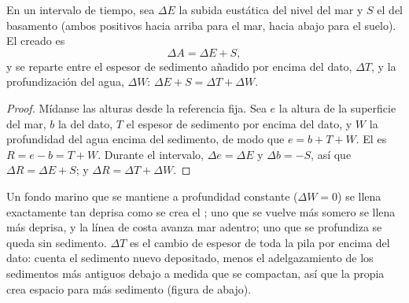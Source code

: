 \begin{proposition}\label{prop:b1:diagenesis-basins:budget}
En un intervalo de tiempo, sea $\Delta E$ la subida eustática del nivel del mar y $S$ el  del basamento (ambos positivos hacia arriba para el mar, hacia abajo para el suelo). El  creado es
\[
  \Delta A = \Delta E + S ,
\]
y se reparte entre el espesor de sedimento añadido por encima del dato, $\Delta T$, y la profundización del agua, $\Delta W$: $\Delta E + S = \Delta T + \Delta W$.
\end{proposition}

\begin{proof}
Mídanse las alturas desde la referencia fija. Sea $e$ la altura de la superficie del mar, $b$ la del dato, $T$ el espesor de sedimento por encima del dato, y $W$ la profundidad del agua
encima del sedimento, de modo que $e = b + T + W$. El  es $R = e - b = T + W$. Durante el intervalo, $\Delta e =
\Delta E$ y $\Delta b = -S$, así que $\Delta R = \Delta E + S$; y $\Delta R =
\Delta T + \Delta W$.
\end{proof}

Un fondo marino que se mantiene a profundidad constante ($\Delta W = 0$) se llena exactamente tan deprisa como se crea el ; uno que se vuelve más somero se llena más deprisa,
y la línea de costa avanza mar adentro; uno que se profundiza se queda sin sedimento. $\Delta T$ es el cambio de espesor de toda la pila por encima del dato: cuenta el sedimento nuevo depositado,
menos el adelgazamiento de los sedimentos más antiguos debajo a medida que se compactan, así que la propia  crea espacio para más sedimento (figura de abajo).

